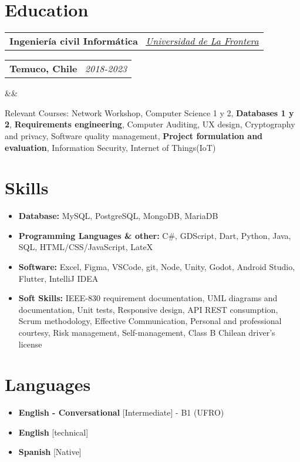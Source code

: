 \documentclass[11pt,a4paper,sans]{moderncv}
\makeatletter
\newcommand*{\customcventry}[7][.13em]{
    \begin{tabular}{@{}l}
    {\bfseries #4} \
    {\itshape #3}
    \end{tabular}
    \hfill
    \begin{tabular}{l@{}}
    {\bfseries #5} \
    {\itshape #2}
    \end{tabular}
    \ifx&#7&%
    \else{\
    \begin{minipage}{\maincolumnwidth}%
    \small#7%
    \end{minipage}}\fi%
    \par\addvspace{#1}
}
\makeatother
\begin{document}
\section{Education}
\customcventry
    {2018-2023}
    {\href{https://1drv.ms/b/c/13c8ae619d64655e/EV5lZJ1hrsgggBOHLAAAAAABHh9OZUbWLd2nx7PTa_OSsg?e=Fedmge}{\underline{Universidad de La Frontera}} }{Ingeniería civil Informática}{Temuco, Chile}
    {}{}
    {Relevant Courses: 
        Network Workshop, 
        Computer Science 1 y 2, 
        \textbf{Databases 1 y 2}, 
        \textbf{Requirements engineering},
        Computer Auditing, 
        UX design, 
        Cryptography and privacy, 
        Software quality management, 
        \textbf{Project formulation and evaluation},
        Information Security,
        Internet of Things(IoT)
}

\section{Skills}{
\begin{itemize}[label=\textbullet]
    \item {\textbf{Database:} 
        MySQL, 
        PostgreSQL, 
        MongoDB, 
        MariaDB
    }
    \item {\textbf{Programming Languages \& other:} 
        C\#, 
        GDScript, 
        Dart, 
        Python, 
        Java,
        SQL,
        HTML/CSS/JavaScript,
        LateX
    }
    \item {\textbf{Software:} 
        Excel,
        Figma,
        VSCode,
        git,
        Node,
        Unity,
        Godot,
        Android Studio,
        Flutter,
        IntelliJ IDEA
    }
    \item {\textbf{Soft Skills:}
        IEEE-830 requirement documentation,
        UML diagrams and documentation,
        Unit tests,
        Responsive design,
        API REST consumption,
        Scrum methodology,
        Effective Communication, 
        Personal and professional courtesy, 
        Risk management, 
        Self-management, 
        Class B Chilean driver's license
    }
\end{itemize}}

\section{Languages}
\begin{multicols}{2}
    \begin{itemize}[label=\textbullet]
        \item \textbf{English - Conversational} [Intermediate] - B1 (UFRO)
        \item \textbf{English} [technical]
        \item \textbf{Spanish} [Native]
    \end{itemize}
\end{multicols}
\end{document}
